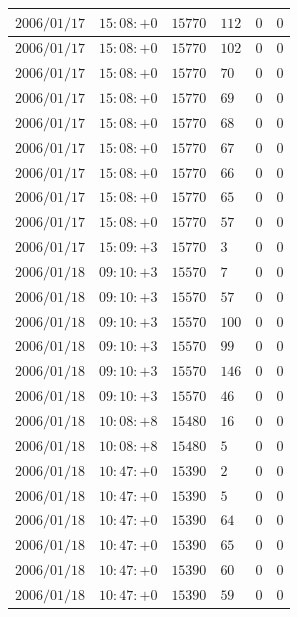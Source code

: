 \documentclass[a4j,papersize,disablejfam,slide,14pt]{jsarticle}
\begin{document}
\begin{description}
\begin{center}
\begin{longtable}{|l|l|l|l|l|l|}
					$2006/01/17$ & $15:08:+0$  & $15770$ & $112$ & $0$ & $0$ \\ \hline
					$2006/01/17$ & $15:08:+0$  & $15770$ & $102$ & $0$ & $0$ \\ \hline
					$2006/01/17$ & $15:08:+0$  & $15770$ & $70$ & $0$ & $0$ \\ \hline
					$2006/01/17$ & $15:08:+0$  & $15770$ & $69$ & $0$ & $0$ \\ \hline
					$2006/01/17$ & $15:08:+0$  & $15770$ & $68$ & $0$ & $0$ \\ \hline
					$2006/01/17$ & $15:08:+0$  & $15770$ & $67$ & $0$ & $0$ \\ \hline
					$2006/01/17$ & $15:08:+0$  & $15770$ & $66$ & $0$ & $0$ \\ \hline
					$2006/01/17$ & $15:08:+0$  & $15770$ & $65$ & $0$ & $0$ \\ \hline
					$2006/01/17$ & $15:08:+0$  & $15770$ & $57$ & $0$ & $0$ \\ \hline
					$2006/01/17$ & $15:09:+3$  & $15770$ & $3$ & $0$ & $0$ \\ \hline
					$2006/01/18$ & $09:10:+3$  & $15570$ & $7$ & $0$ & $0$ \\ \hline
					$2006/01/18$ & $09:10:+3$  & $15570$ & $57$ & $0$ & $0$ \\ \hline
					$2006/01/18$ & $09:10:+3$  & $15570$ & $100$ & $0$ & $0$ \\ \hline
					$2006/01/18$ & $09:10:+3$  & $15570$ & $99$ & $0$ & $0$ \\ \hline
					$2006/01/18$ & $09:10:+3$  & $15570$ & $146$ & $0$ & $0$ \\ \hline
					$2006/01/18$ & $09:10:+3$  & $15570$ & $46$ & $0$ & $0$ \\ \hline
					$2006/01/18$ & $10:08:+8$  & $15480$ & $16$ & $0$ & $0$ \\ \hline
					$2006/01/18$ & $10:08:+8$  & $15480$ & $5$ & $0$ & $0$ \\ \hline
					$2006/01/18$ & $10:47:+0$  & $15390$ & $2$ & $0$ & $0$ \\ \hline
					$2006/01/18$ & $10:47:+0$  & $15390$ & $5$ & $0$ & $0$ \\ \hline
					$2006/01/18$ & $10:47:+0$  & $15390$ & $64$ & $0$ & $0$ \\ \hline
					$2006/01/18$ & $10:47:+0$  & $15390$ & $65$ & $0$ & $0$ \\ \hline
					$2006/01/18$ & $10:47:+0$  & $15390$ & $60$ & $0$ & $0$ \\ \hline
					$2006/01/18$ & $10:47:+0$  & $15390$ & $59$ & $0$ & $0$ \\ \hline

\end{longtable}
\end{center}
\end{description}
\end{document}
